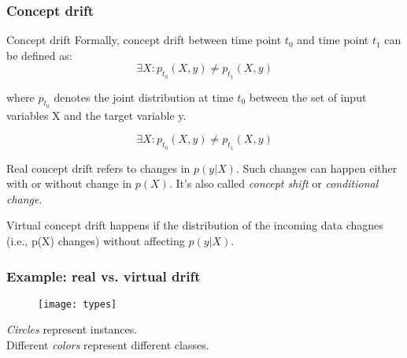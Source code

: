 \begin{frame}[allowframebreaks]
\frametitle{Concept drift}
\begin{de}{Concept drift}
Formally, concept drift between time point $t_0$ and time point $t_1$ can be defined as:
$$\exists X:p_{t_0}(X,y) \neq p_{t_1}(X,y)$$

where $p_{t_0}$ denotes the joint distribution at time $t_0$ between the set of input variables X and the target variable y.
\end{de}




\framebreak
$$\exists X:p_{t_0}(X,y) \neq p_{t_1}(X,y)$$
\begin{de}{Real concept drift}
refers to changes in $p(y|X)$. Such changes can happen either with
or without change in $p(X)$. It's also called \textit{concept shift} or \textit{conditional change}.
\end{de}

\begin{de}{Virtual concept drift}
happens if the distribution of the incoming data chagnes (i.e., p(X) changes) without affecting $p(y|X)$.
\end{de}
\end{frame}


\begin{frame}
\frametitle{Example: real vs. virtual drift}
\begin{figure}
	\texttt{[image: types]}
\end{figure}
\textit{Circles} represent instances.\\
Different \textit{colors} represent different classes.

\end{frame}

